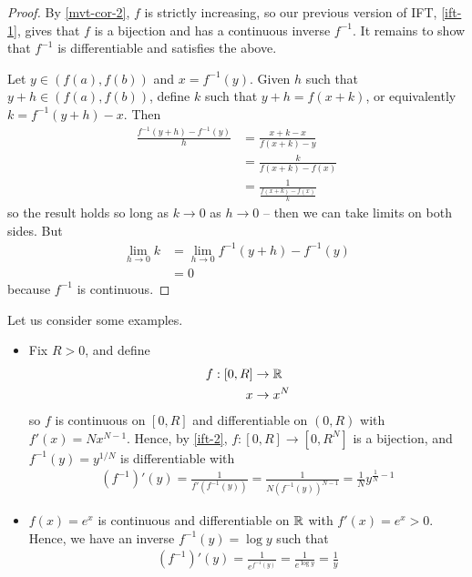 \documentclass{../../template/note}
\begin{document}
    \begin{proof}
        By \cref{mvt-cor-2}, \(f\) is strictly increasing, so our previous version of IFT, \cref{ift-1}, gives that \(f\) is a bijection and has a continuous inverse \(f^{-1}\). It remains to show that \(f^{-1}\) is differentiable and satisfies the above.

        Let \(y \in (f(a), f(b))\) and \(x = f^{-1}(y)\). Given \(h\) such that \(y + h \in (f(a), f(b))\), define \(k\) such that \(y+h=f(x+k)\), or equivalently \(k=f^{-1}(y+h)-x\). Then
        \begin{align*}
            \frac{f^{-1}(y+h)-f^{-1}(y)}{h} &= \frac{x+k-x}{f(x+k)-y} \\
            &= \frac{k}{f(x+k)-f(x)} \\
            &= \frac 1{\frac{f(x+k)-f(x)}{k}}
        \end{align*}
        so the result holds so long as \(k \to 0\) as \(h \to 0\) -- then we can take limits on both sides. But
        \begin{align*}
            \lim_{h \to 0} k &= \lim_{h \to 0} f^{-1}(y+h) - f^{-1}(y) \\
            &= 0
        \end{align*}
        because \(f^{-1}\) is continuous.       
    \end{proof}
    
    \begin{example}
        Let us consider some examples.
        \begin{itemize}
            \item Fix \(R > 0\), and define
            \begin{align*}
                f: [0, R] &\to \mathbb R \\
                x &\to x^N
            \end{align*}
            so \(f\) is continuous on \([0, R]\) and differentiable on \((0, R)\) with \(f'(x) = Nx^{N-1}\). Hence, by \cref{ift-2}, \(f: [0, R] \to [0, R^N]\) is a bijection, and \(f^{-1}(y) = y^{1/N}\) is differentiable with
            \begin{align*}
                (f^{-1})'(y) = \frac 1 {f'(f^{-1}(y))} = \frac 1 {N (f^{-1}(y))^{N-1}} = \frac 1 N y^{\frac 1 N - 1}
            \end{align*}
            \item \(f(x) = e^x\) is continuous and differentiable on \(\mathbb R\) with \(f'(x) = e^x > 0\). Hence, we have an inverse \(f^{-1}(y) = \log y\) such that
            \begin{align*}
                (f^{-1})'(y) = \frac 1 {e^{f^{-1}(y)}} = \frac 1 {e^{\log y}} = \frac 1 y
            \end{align*}
        \end{itemize}
    \end{example}
    
\end{document}
